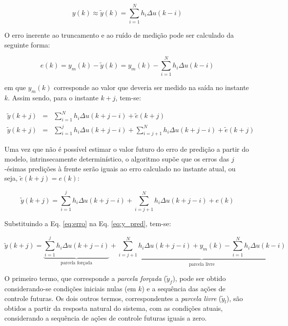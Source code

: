 \begin{equation}\label{eq:y_til}
y(k) \approx \tilde{y}(k) = \sum_{i=1}^N h_i\Delta u(k-i)
\end{equation}

O erro inerente ao truncamento e ao ruído de medição pode ser calculado da
seguinte forma:

\begin{equation}\label{eq:erro}
e(k) = y_m(k) - \tilde{y}(k) = y_m(k) - \sum_{i=1}^N h_i\Delta u(k-i)
\end{equation}

\noindent em que $y_m(k)$ corresponde ao valor que deveria ser medido na saída
no instante $k$. Assim sendo, para o instante $k+j$, tem-se:

\begin{eqnarray}
\tilde{y}(k+j) & = & \sum_{i=1}^N h_i\Delta u(k+j-i) + \tilde{e}(k+j)\nonumber\\
\tilde{y}(k+j) & = & \sum_{i=1}^j h_i\Delta u(k+j-i) +
                     \sum_{i=j+1}^N h_i\Delta u(k+j-i) + \tilde{e}(k+j)\nonumber
\end{eqnarray}

Uma vez que não é possível estimar o valor futuro do erro de predição a partir
do modelo, intrinsecamente determinístico, o algoritmo supõe que os erros das
$j$-ésimas predições à frente serão iguais ao erro calculado no instante atual,
ou seja, $\tilde{e}(k+j) = e(k)$:

\begin{equation}\label{eq:y_pred}
\tilde{y}(k+j) = \sum_{i=1}^j h_i\Delta u(k+j-i) +
                 \sum_{i=j+1}^N h_i\Delta u(k+j-i) + e(k)
\end{equation}

Substituindo a Eq. \ref{eq:erro} na Eq. \ref{eq:y_pred}, tem-se:

\begin{equation}\label{eq:dmc}
\tilde{y}(k+j) = \underbrace{\sum_{i=1}^j h_i\Delta u(k+j-i)}_
                 {\text{parcela forçada}} +
                 \underbrace{\sum_{i=j+1}^N h_i\Delta u(k+j-i) +
                             y_m(k) - \sum_{i=1}^N h_i\Delta u(k-i)}_
                 {\text{parcela livre}}
\end{equation}

O primeiro termo, que corresponde a {\it parcela forçada} ($\tilde{y}_f$), pode
ser obtido considerando-se condições iniciais nulas (em $k$) e a sequência das
ações de controle futuras. Os dois outros termos, correspondentes a {\it parcela
livre} ($\tilde{y}_l$), são obtidos a partir da resposta natural do sistema, com
as condições atuais, considerando a sequência de ações de controle futuras
iguais a zero.

